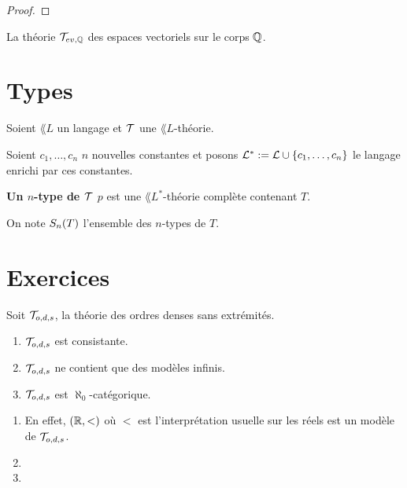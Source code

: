 \documentclass[a4paper, 12pt]{report}
\begin{document}
\ifdefined\outputproof
\begin{proof}

\end{proof}
\fi

\begin{exemple}
	La théorie $\mathcal{T}_{ev, \mathbb{Q}}$ des espaces vectoriels sur le corps
	$\mathbb{Q}$.
\end{exemple}


\chapter{Types}

\begin{definition}
	Soient $\lang{L}$ un langage et $\mathcal{T}$ une $\lang{L}$-théorie.

	Soient $c_{1}, \dots, c_{n}$ $n$ nouvelles constantes et posons
	$\mathcal{L}^{*} := \mathcal{L} \cup \left\{ c_{1}, \dots, c_{n} \right\}$ le langage
	enrichi par ces constantes.

	\textbf{Un $n$-type de $\mathcal{T}$} $p$ est une $\lang{L}^{*}$-théorie complète contenant
	$T$.

	On note $S_{n}(T)$ l'ensemble des $n$-types de $T$.
\end{definition}

\chapter{Exercices}

\begin{exercice}
	\label{exercice:ordre_dense_sans_extremites_aleph_0_categorique}
	Soit $\mathcal{T}_{o, d, s}$, la théorie des ordres denses sans extrémités.
	\begin{enumerate}
		\item $\mathcal{T}_{o, d, s}$ est consistante.
		\item $\mathcal{T}_{o, d, s}$ ne contient que des modèles infinis.
		\item $\mathcal{T}_{o, d, s}$ est $\aleph_{0}$-catégorique.
	\end{enumerate}
\end{exercice}

\begin{answer}
	\begin{enumerate}
		\item En effet, $(\mathbb{R}, <)$ où $<$ est l'interprétation usuelle sur les
			réels est un modèle de $\mathcal{T}_{o, d, s}$.
		\item
		\item
	\end{enumerate}
\end{answer}
\end{document}
